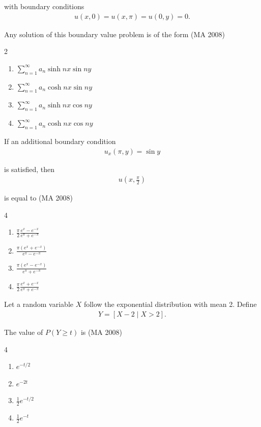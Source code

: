 with boundary conditions
\begin{align}
    u(x, 0) = u(x, \pi) = u(0, y) = 0.
\end{align}

Any solution of this boundary value problem is of the form
\hfill (MA 2008)
\begin{multicols}{2}
\begin{enumerate}
    \item $\sum_{n=1}^\infty a_n \sinh nx \sin ny$
    \item $\sum_{n=1}^\infty a_n \cosh nx \sin ny$
    \item $\sum_{n=1}^\infty a_n \sinh nx \cos ny$
    \item $\sum_{n=1}^\infty a_n \cosh nx \cos ny$
\end{enumerate}
\end{multicols}

\item
If an additional boundary condition
\begin{align}
    u_x(\pi, y) = \sin y
\end{align}

is satisfied, then 
\begin{align}
    u\left(x, \frac{\pi}{2}\right)
\end{align}

is equal to
\hfill (MA 2008)
\begin{multicols}{4}
\begin{enumerate}
    \item $\frac{\pi}{2} \frac{e^x - e^{-x}}{e^\pi + e^{-\pi}}$
    \item $\frac{\pi (e^x + e^{-x})}{e^\pi - e^{-\pi}}$
    \item $\frac{\pi (e^x - e^{-x})}{e^\pi + e^{-\pi}}$
    \item $\frac{\pi}{2} \frac{e^x + e^{-x}}{e^\pi + e^{-\pi}}$
\end{enumerate}
\end{multicols}

\item
Let a random variable $X$ follow the exponential distribution with mean 2. Define
\begin{align}
    Y = [X - 2 \mid X > 2].
\end{align}

The value of $P(Y \geq t)$ is
\hfill (MA 2008)
\begin{multicols}{4}
\begin{enumerate}
    \item $e^{-t/2}$
    \item $e^{-2t}$
    \item $\frac{1}{2} e^{-t/2}$
    \item $\frac{1}{2} e^{-t}$
\end{enumerate}
\end{multicols}

